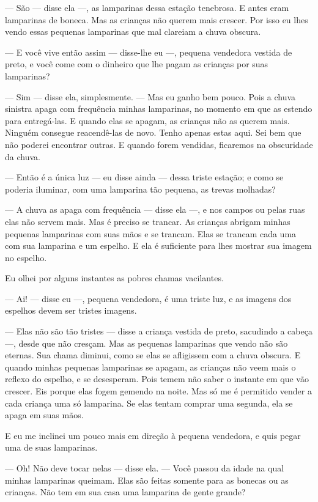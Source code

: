 --- São --- disse ela ---, as lamparinas dessa estação tenebrosa. E antes eram
lamparinas de boneca. Mas as crianças não querem mais crescer. Por isso eu
lhes vendo essas pequenas lamparinas que mal clareiam a chuva obscura.

--- E você vive então assim --- disse-lhe eu ---, pequena vendedora vestida de
preto, e você come com o dinheiro que lhe pagam as crianças por suas
lamparinas?

--- Sim --- disse ela, simplesmente. --- Mas eu ganho bem pouco. Pois a chuva
sinistra apaga com frequência minhas lamparinas, no momento em que as
estendo para entregá-las. E quando elas se apagam, as crianças não as
querem mais. Ninguém consegue reacendê-las de novo. Tenho apenas estas
aqui. Sei bem que não poderei encontrar outras. E quando forem vendidas,
ficaremos na obscuridade da chuva.

--- Então é a única luz --- eu disse ainda --- dessa triste estação; e como se
poderia iluminar, com uma lamparina tão pequena, as trevas molhadas?

--- A chuva as apaga com frequência --- disse ela ---, e nos campos ou pelas
ruas elas não servem mais. Mas é preciso se trancar. As crianças abrigam
minhas pequenas lamparinas com suas mãos e se trancam. Elas se trancam cada
uma com sua lamparina e um \mbox{espelho.} E ela é suficiente para lhes mostrar sua
imagem no espelho.

Eu olhei por alguns instantes as pobres chamas vacilantes.

--- Ai! --- disse eu ---, pequena vendedora, é uma triste luz, e as imagens dos
espelhos devem ser tristes imagens.

--- Elas não são tão tristes --- disse a criança vestida de preto, sacudindo a
cabeça ---,  desde que não cresçam. Mas as pequenas lamparinas que vendo não são
eternas. Sua chama diminui, como se elas se afligissem com a chuva
obscura. E quando minhas pequenas lamparinas se apagam, as crianças não veem
mais o reflexo do espelho, e se desesperam. Pois temem não saber o
instante em que vão crescer. Eis porque elas fogem gemendo na noite. Mas
só me é permitido vender a cada criança uma só lamparina. Se elas tentam
comprar uma segunda, ela se apaga em suas mãos.

E eu me inclinei um pouco mais em direção à pequena vendedora, e quis
pegar uma de suas lamparinas.

--- Oh! Não deve tocar nelas --- disse ela.  --- Você passou da idade na qual
minhas lamparinas queimam. Elas são feitas somente para as bonecas ou as
crianças. Não tem em sua casa uma lamparina de gente grande?

